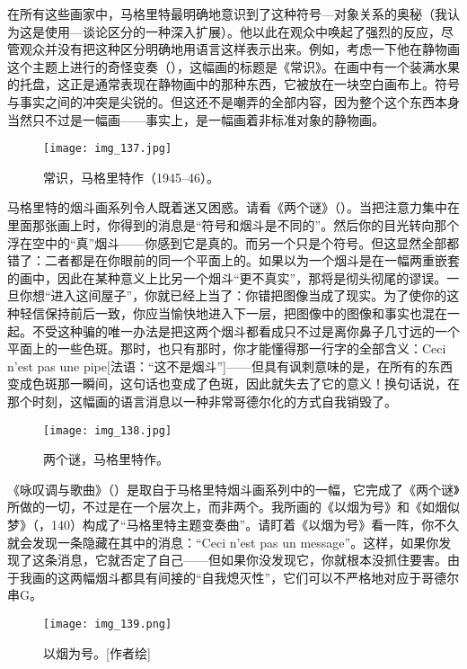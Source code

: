 在所有这些画家中，马格里特最明确地意识到了这种符号—对象关系的奥秘（我认为这是使用—谈论区分的一种深入扩展）。他以此在观众中唤起了强烈的反应，尽管观众并没有把这种区分明确地用语言这样表示出来。例如，考虑一下他在静物画这个主题上进行的奇怪变奏（），这幅画的标题是《常识》。在画中有一个装满水果的托盘，这正是通常表现在静物画中的那种东西，它被放在一块空白画布上。符号与事实之间的冲突是尖锐的。但这还不是嘲弄的全部内容，因为整个这个东西本身当然只不过是一幅画——事实上，是一幅画着非标准对象的静物画。

\begin{figure}
\texttt{[image: img\_137.jpg]}
\caption[常识，马格里特作。]
  {常识，马格里特作（1945--46）。}
\end{figure}

马格里特的烟斗画系列令人既着迷又困惑。请看《两个谜》（）。当把注意力集中在里面那张画上时，你得到的消息是“符号和烟斗是不同的”。然后你的目光转向那个浮在空中的“真”烟斗——你感到它是真的。而另一个只是个符号。但这显然全部都错了：二者都是在你眼前的同一个平面上的。如果以为一个烟斗是在一幅两重嵌套的画中，因此在某种意义上比另一个烟斗“更不真实”，那将是彻头彻尾的谬误。一旦你想“进入这间屋子”，你就已经上当了：你错把图像当成了现实。为了使你的这种轻信保持前后一致，你应当愉快地进入下一层，把图像中的图像和事实也混在一起。不受这种骗的唯一办法是把这两个烟斗都看成只不过是离你鼻子几寸远的一个平面上的一些色斑。那时，也只有那时，你才能懂得那一行字的全部含义：Ceci n'est pas une pipe[法语：“这不是烟斗”]——但具有讽刺意味的是，在所有的东西变成色斑那一瞬间，这句话也变成了色斑，因此就失去了它的意义！换句话说，在那个时刻，这幅画的语言消息以一种非常哥德尔化的方式自我销毁了。

\begin{figure}
\texttt{[image: img\_138.jpg]}
\caption[两个谜，马格里特作。]
  {两个谜，马格里特作。}
\end{figure}

《咏叹调与歌曲》（）是取自于马格里特烟斗画系列中的一幅，它完成了《两个谜》所做的一切，不过是在一个层次上，而非两个。我所画的《以烟为号》和《如烟似梦》（，140）构成了“马格里特主题变奏曲”。请盯着《以烟为号》看一阵，你不久就会发现一条隐藏在其中的消息：“Ceci n'est pas un message”\lnote{[法文：“这不是消息”]}。这样，如果你发现了这条消息，它就否定了自己——但如果你没发现它，你就根本没抓住要害。由于我画的这两幅烟斗都具有间接的“自我熄灭性”，它们可以不严格地对应于哥德尔串G。

\begin{figure}
\texttt{[image: img\_139.png]}
\caption[以烟为号。]
  {以烟为号。[作者绘] }
\end{figure}

